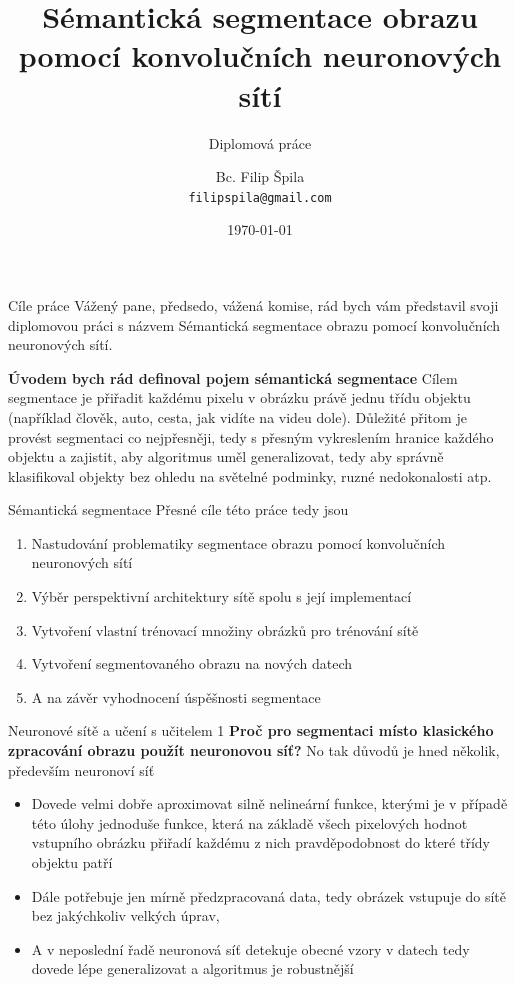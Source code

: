 \documentclass[aspectratio=1610]{beamer}
\title[Sémantická segmentace obrazu pomocí CNN]
{Sémantická segmentace obrazu pomocí konvolučních neuronových sítí}
\subtitle
{Diplomová práce}
\author[Bc. Filip Špila]
{Bc. Filip Špila \\
	\texttt{filipspila@gmail.com}}
\institute
{Ústav mechaniky těles, mechatroniky a biomechaniky \\
	Vysoké učení technické v Brně
}
\date{\today}
\begin{document}
	
	
	\begin{frame}
	\titlepage
	\end{frame}
\begin{frame}{Cíle práce}
Vážený pane, předsedo, vážená komise, rád bych vám představil svoji diplomovou práci s názvem Sémantická segmentace obrazu pomocí konvolučních neuronových sítí. 

\textbf{Úvodem bych rád definoval pojem sémantická segmentace} Cílem segmentace je přiřadit každému pixelu v obrázku právě jednu třídu objektu (například člověk, auto, cesta, jak vidíte na videu dole). Důležité přitom je provést segmentaci co nejpřesněji, tedy s přesným vykreslením hranice každého objektu a zajistit, aby algoritmus uměl generalizovat, tedy aby správně klasifikoval objekty bez ohledu na světelné podminky, ruzné nedokonalosti atp.
\end{frame}
\begin{frame}{Sémantická segmentace}
Přesné cíle této práce tedy jsou
\begin{enumerate}
	\item Nastudování problematiky segmentace obrazu pomocí konvolučních neuronových sítí
	\item Výběr perspektivní architektury sítě spolu s její implementací
	\item Vytvoření vlastní trénovací množiny obrázků pro trénování sítě
	\item Vytvoření segmentovaného obrazu na nových datech
	\item A na závěr vyhodnocení úspěšnosti segmentace
\end{enumerate}	
\end{frame}
\begin{frame}{Neuronové sítě a učení s učitelem 1}
	\textbf{Proč pro segmentaci místo klasického zpracování obrazu použít neuronovou síť?} No tak důvodů je hned několik, především neuronoví síť
	\begin{itemize}
		\item Dovede velmi dobře aproximovat silně nelineární funkce, kterými je v případě této úlohy jednoduše funkce, která na základě všech pixelových hodnot vstupního obrázku přiřadí každému z nich pravděpodobnost do které třídy objektu patří
		\item Dále potřebuje jen mírně předzpracovaná data, tedy obrázek vstupuje do sítě bez jakýchkoliv velkých úprav,
		\item A v neposlední řadě neuronová síť detekuje obecné vzory v datech tedy dovede lépe generalizovat a algoritmus je robustnější	
	\end{itemize}
\end{frame}	
\end{document}
